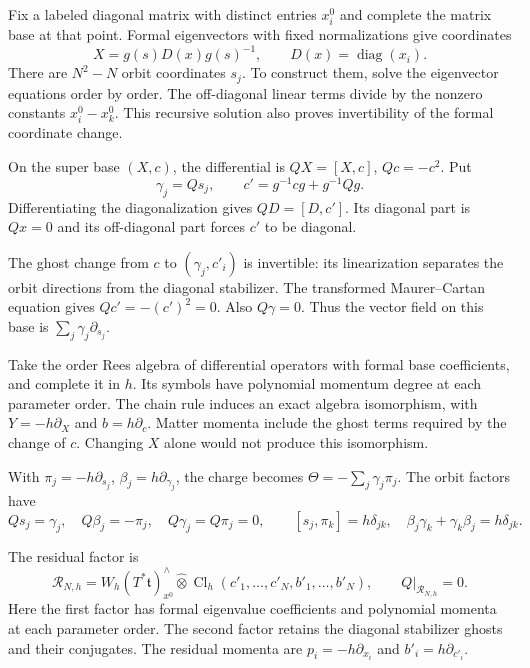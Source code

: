 Fix a labeled diagonal matrix with distinct entries $x_i^0$
and complete the matrix base at that point. Formal eigenvectors
with fixed normalizations give coordinates
\[
 X=g(s)D(x)g(s)^{-1},\qquad D(x)=\operatorname{diag}(x_i).
\]
There are $N^2-N$ orbit coordinates $s_j$. To construct them,
solve the eigenvector equations order by order.
The off-diagonal linear terms divide by the nonzero constants
$x_i^0-x_k^0$. This recursive solution also proves
invertibility of the formal coordinate change.

On the super base $(X,c)$, the differential is
$QX=[X,c]$, $Qc=-c^2$. Put
\[
 \gamma_j=Qs_j,\qquad c'=g^{-1}cg+g^{-1}Qg.
\]
Differentiating the diagonalization gives $QD=[D,c']$.
Its diagonal part is $Qx=0$ and its off-diagonal part forces
$c'$ to be diagonal.

The ghost change from $c$ to
$(\gamma_j,c'_i)$ is invertible: its linearization separates
the orbit directions from the diagonal stabilizer. The transformed
Maurer--Cartan equation gives $Qc'=-(c')^2=0$.
Also $Q\gamma=0$. Thus the vector field on this base is
$\sum_j\gamma_j\partial_{s_j}$.

Take the order Rees algebra of differential operators with
formal base coefficients, and complete it in $h$. Its symbols
have polynomial momentum degree at each parameter order.
The chain rule induces an exact algebra isomorphism, with
$Y=-h\partial_X$ and
$b=h\partial_c$. Matter momenta include the ghost terms
required by the change of $c$. Changing $X$ alone would not
produce this isomorphism.

With
$\pi_j=-h\partial_{s_j}$, $\beta_j=h\partial_{\gamma_j}$,
the charge becomes $\Theta=-\sum_j\gamma_j\pi_j$.
The orbit factors have
\[
 Qs_j=\gamma_j,\quad Q\beta_j=-\pi_j,\quad
 Q\gamma_j=Q\pi_j=0,\qquad
 [s_j,\pi_k]=h\delta_{jk},\quad
 \beta_j\gamma_k+\gamma_k\beta_j=h\delta_{jk}.
\]

The residual factor is
\[
 \mathcal R_{N,h}
 =W_h(T^*\mathfrak t)^\wedge_{x^0}
   \widehat\otimes
   \operatorname{Cl}_h(c'_1,\ldots,c'_N,b'_1,\ldots,b'_N),
 \qquad Q|_{\mathcal R_{N,h}}=0.
\]
Here the first factor has formal eigenvalue coefficients and
polynomial momenta at each parameter order. The second factor
retains the diagonal stabilizer ghosts and their conjugates.
The residual momenta are $p_i=-h\partial_{x_i}$ and
$b'_i=h\partial_{c'_i}$.

